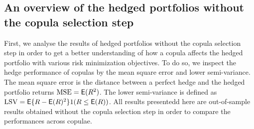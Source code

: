 \subsection{An overview of the hedged portfolios without the copula selection step}\label{subsec:HP1}
First, we analyse the results of hedged portfolios without the copula
selection step in order to get a better understanding of how a copula
affects the hedged portfolio with various risk minimization
objectives.
To do so, we inspect the hedge performance of copulas by
the mean square error and lower semi-variance.
The mean square error
is the distance between a perfect hedge and the hedged portfolio
returns $\operatorname{MSE}= \mbox{\sf E} (R^2)$.
The lower semi-variance is defined as 
$\operatorname{LSV}=\mbox{\sf E} \{R-\mbox{\sf E}(R)^2\}1(R\leq \mbox{\sf E}(R))$.
All results presentedd here are out-of-sample results obtained without
the copula selection step in order to compare the performances across
copulae.

